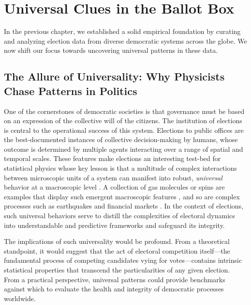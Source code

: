 \chapter{Universal Clues in the Ballot Box}
\label{chap4}

In the previous chapter, we established a solid empirical foundation by curating and analyzing election data from diverse democratic systems across the globe. We now shift our focus towards uncovering universal patterns in these data. 

\section{The Allure of Universality: Why Physicists Chase Patterns in Politics}

One of the cornerstones of democratic societies is that governance must be based on an expression of the collective will of the citizens. The institution of elections is central to the operational success of this system. Elections to public offices are the best-documented instances of collective decision-making by humans, whose outcome is determined by multiple agents interacting over a range of spatial and temporal scales. These features make elections an interesting test-bed for statistical physics whose key lesson is that a multitude of complex interactions between microscopic units of a system can manifest into robust, {\it universal} behavior at a macroscopic level \cite{anderson1972more,strogatz2022fifty,CasForLor2009, JedSzn2019, MigTor2020, galam2012, brams2008, ForMacRed2013, Bouchaud2023, SenCha2014, PerJorRan2017,JusHolKan2022,redner2019reality}. A collection of gas molecules or spins are examples that display such emergent macroscopic features \cite{REI65}, and so are complex processes such as earthquakes \cite{Corral2004,Corral2006} and financial markets \cite{PleGopRos1999}. In the context of elections, such universal behaviors serve to distill the complexities of electoral dynamics into understandable and predictive frameworks and safeguard its integrity.

The implications of such universality would be profound. From a theoretical standpoint, it would suggest that the act of electoral competition itself—the fundamental process of competing candidates vying for votes—contains intrinsic statistical properties that transcend the particularities of any given election. From a practical perspective, universal patterns could provide benchmarks against which to evaluate the health and integrity of democratic processes worldwide.

